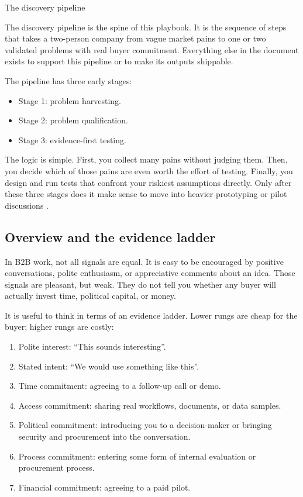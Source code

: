 \documentclass[10pt, a4paper, twocolumn]{article} %
\makeatletter
\let\orig@section\section %
\renewcommand{\section}{%
  \@ifstar{\orig@section*}{\unnumberedsteppingsection}%
}
\newcommand{\unnumberedsteppingsection}[1]{%
  \refstepcounter{section}%
  \orig@section*{#1}%
}
\makeatother
\begin{document}
\section{The discovery pipeline}

The discovery pipeline is the spine of this playbook. It is the sequence of steps that takes a two-person company from vague market pains to one or two validated problems with real buyer commitment. Everything else in the document exists to support this pipeline or to make its outputs shippable.

The pipeline has three early stages:

\begin{itemize}
  \item Stage 1: problem harvesting.
  \item Stage 2: problem qualification.
  \item Stage 3: evidence-first testing.
\end{itemize}

The logic is simple. First, you collect many pains without judging them. Then, you decide which of those pains are even worth the effort of testing. Finally, you design and run tests that confront your riskiest assumptions directly. Only after these three stages does it make sense to move into heavier prototyping or pilot discussions \citep{ries2011lean,bland2019testing}.

\subsection{Overview and the evidence ladder}

In B2B work, not all signals are equal. It is easy to be encouraged by positive conversations, polite enthusiasm, or appreciative comments about an idea. Those signals are pleasant, but weak. They do not tell you whether any buyer will actually invest time, political capital, or money.

It is useful to think in terms of an evidence ladder. Lower rungs are cheap for the buyer; higher rungs are costly:

\begin{enumerate}
  \item Polite interest: ``This sounds interesting''.
  \item Stated intent: ``We would use something like this''.
  \item Time commitment: agreeing to a follow-up call or demo.
  \item Access commitment: sharing real workflows, documents, or data samples.
  \item Political commitment: introducing you to a decision-maker or bringing security and procurement into the conversation.
  \item Process commitment: entering some form of internal evaluation or procurement process.
  \item Financial commitment: agreeing to a paid pilot.
\end{enumerate}
\end{document}
